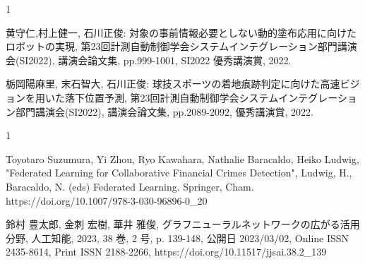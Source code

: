 \begin{受賞}{1}


黄守仁,村上健一, 石川正俊: 対象の事前情報必要としない動的塗布応用に向けたロボットの実現, 第23回計測自動制御学会システムインテグレーション部門講演会(SI2022), 講演会論文集, pp.999-1001, SI2022 優秀講演賞, 2022.


栃岡陽麻里, 末石智大, 石川正俊: 球技スポーツの着地痕跡判定に向けた高速ビジョンを用いた落下位置予測, 第23回計測自動制御学会システムインテグレーション部門講演会(SI2022), 講演会論文集, pp.2089-2092, 優秀講演賞, 2022.


\end{受賞}

\begin{著書}{1}



Toyotaro Suzumura, Yi Zhou, Ryo Kawahara, Nathalie Baracaldo, Heiko Ludwig,
"Federated Learning for Collaborative Financial Crimes Detection",
Ludwig, H., Baracaldo, N. (eds) Federated Learning. Springer, Cham. https://doi.org/10.1007/978-3-030-96896-0\_20

鈴村 豊太郎, 金刺 宏樹, 華井 雅俊, グラフニューラルネットワークの広がる活用分野, 人工知能, 2023, 38 巻, 2 号, p. 139-148, 公開日 2023/03/02, Online ISSN 2435-8614, Print ISSN 2188-2266, https://doi.org/10.11517/jjsai.38.2\_139

\end{著書}

